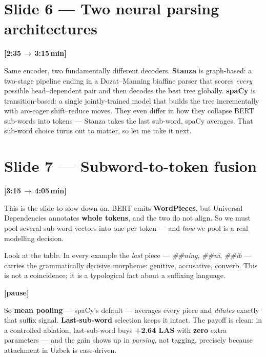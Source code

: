 \documentclass[12pt,a4paper]{article}
\newcommand{\timing}[2]{%
   \par\noindent\textbf{\small [#1\,$\to$\,#2\,min]}\par\vspace{0.2em}}
\newcommand{\say}[1]{\textbf{#1}}
\newcommand{\breathe}{\par\vspace{0.4em}\textbf{[pause]}\par}
\begin{document}
\section*{Slide 6 --- Two neural parsing architectures}
\timing{2:35}{3:15}

Same encoder, two fundamentally different decoders. \say{Stanza} is
graph-based: a two-stage pipeline ending in a Dozat--Manning biaffine
parser that scores \emph{every} possible head--dependent pair and then
decodes the best tree globally. \say{spaCy} is transition-based: a single
jointly-trained model that builds the tree incrementally with arc-eager
shift--reduce moves. They even differ in how they collapse BERT
sub-words into tokens --- Stanza takes the last sub-word, spaCy averages.
That sub-word choice turns out to matter, so let me take it next.

\section*{Slide 7 --- Subword-to-token fusion}
\timing{3:15}{4:05}

This is the slide to slow down on. BERT emits \say{WordPieces}, but
Universal Dependencies annotates \say{whole tokens}, and the two do not
align. So we must pool several sub-word vectors into one per token --- and
\emph{how} we pool is a real modelling decision.

Look at the table. In every example the \emph{last} piece ---
\textit{\#\#ning}, \textit{\#\#ni}, \textit{\#\#ib} --- carries the
grammatically decisive morpheme: genitive, accusative, converb. This is
not a coincidence; it is a typological fact about a suffixing language.

\breathe

So \say{mean pooling} --- spaCy's default --- averages every piece and
\emph{dilutes} exactly that suffix signal. \say{Last-sub-word} selection
keeps it intact. The payoff is clean: in a controlled ablation,
last-sub-word buys \textbf{+2.64 LAS} with \say{zero} extra parameters ---
and the gain shows up in \emph{parsing}, not tagging, precisely because
attachment in Uzbek is case-driven.

\end{document}
